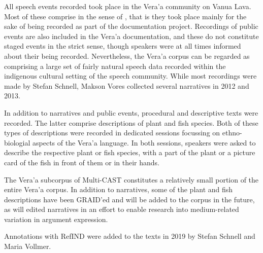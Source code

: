 All speech events recorded took place in the Vera'a community on Vanua Lava. Most of these comprise  in the sense of , that is they took place mainly for the sake of being recorded as part of the documentation project. Recordings of public events are also included in the Vera'a documentation, and these do not constitute staged events in the strict sense, though speakers were at all times informed about their being recorded. Nevertheless, the Vera'a corpus can be regarded as comprising a large set of
fairly natural speech data recorded within the indigenous cultural setting of the speech community. While most recordings were made by Stefan Schnell, Makson Vores collected several narratives in 2012 and 2013.

In addition to narratives and public events, procedural and descriptive texts were recorded. The latter comprise descriptions of plant and fish species. Both of these types of descriptions were recorded in dedicated sessions focussing on ethno-biologial aspects of the Vera'a language. In both sessions, speakers were asked to describe the respective plant or fish species, with a part of the plant or a picture card of the fish in front of them or in their hands.

The Vera'a subcorpus of Multi-CAST constitutes a relatively small portion of the entire Vera'a corpus. In addition to narratives, some of the plant and fish descriptions have been GRAID'ed and will be added to the corpus in the future, as will edited narratives in an effort to enable research into medium-related variation in argument expression.

Annotations with RefIND were added to the texts in 2019 by Stefan Schnell and Maria Vollmer.



